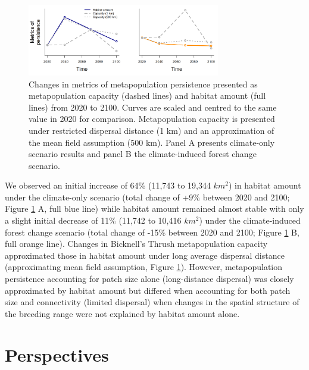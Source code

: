 \documentclass[12pt]{article}
\begin{document}
\begin{figure}
\hypertarget{fig:persistence}{%
\centering
\includegraphics[width=0.75\textwidth,height=\textheight]{./manuscript/img/capacity.png}
\caption{Changes in metrics of metapopulation persistence presented as
metapopulation capacity (dashed lines) and habitat amount (full lines)
from 2020 to 2100. Curves are scaled and centred to the same value in
2020 for comparison. Metapopulation capacity is presented under
restricted dispersal distance (1 km) and an approximation of the mean
field assumption (500 km). Panel A presents climate-only scenario
results and panel B the climate-induced forest change
scenario.}\label{fig:persistence}
}
\end{figure}

We observed an initial increase of 64\% (11,743 to 19,344 \(km^2\)) in
habitat amount under the climate-only scenario (total change of +9\%
between 2020 and 2100; Figure \ref{fig:persistence} A, full blue line)
while habitat amount remained almost stable with only a slight initial
decrease of 11\% (11,742 to 10,416 \(km^2\)) under the climate-induced
forest change scenario (total change of -15\% between 2020 and 2100;
Figure \ref{fig:persistence} B, full orange line). Changes in Bicknell's
Thrush metapopulation capacity approximated those in habitat amount
under long average dispersal distance (approximating mean field
assumption, Figure \ref{fig:persistence}). However, metapopulation
persistence accounting for patch size alone (long-distance dispersal)
was closely approximated by habitat amount but differed when accounting
for both patch size and connectivity (limited dispersal) when changes in
the spatial structure of the breeding range were not explained by
habitat amount alone.

\hypertarget{perspectives}{%
\section{Perspectives}\label{perspectives}}
\end{document}
